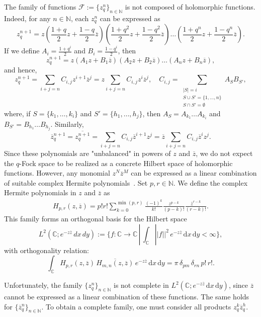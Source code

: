 \documentclass[10pt]{amsart}
\theoremstyle{plain}
\theoremstyle{definition}
\newtheorem{definition}[theorem]{Definition}
\renewcommand{\bar}[1]{\overline{#1}}
\begin{document}
The family of functions $\mathcal{F} := \{z_q^n\}_{n \in \mathbb{N}}$ is not composed of holomorphic functions. Indeed, for any $ n \in \mathbb{N} $, each $ z_q^n $ can be expressed as~\cite{Pashaev2014,Am}
\[
z_q^{n+1} = z\left(\frac{1+q}{2}z + \frac{1-q}{2}\bar{z}\right)
\left(\frac{1+q^2}{2}z + \frac{1-q^2}{2}\bar{z}\right)
\dots \left(\frac{1+q^n}{2}z + \frac{1-q^n}{2}\bar{z}\right).
\]
If we define $ A_i = \frac{1 + q^{i}}{2} $ and $ B_i = \frac{1 - q^{i}}{2} $, then
\[
z_q^{n+1}  = z(A_1 z + B_1 \bar{z}) (A_2 z + B_2 \bar{z}) \dots (A_n z + B_n \bar{z}),
\]
and hence,
$$
z_q^{n+1} = \sum_{i + j = n} C_{i,j} z^{i+1} \bar{z}^j  = z\sum_{i + j = n} C_{i,j} z^{i} \bar{z}^j , \quad 
C_{i,j} = \sum_{\substack{|S| = i \\ S \cup S' = \{1, \dots, n\} \\  S \cap S' = \emptyset}} A_S B_{S'},
$$
where, if $ S = \{k_1, \dots, k_i\} $ and $ S' = \{h_1, \dots, h_j\} $, then $ A_S = A_{k_1} \dots A_{k_i} $ and $ B_{S'} = B_{h_1} \dots B_{h_j} $.
{ Similarly, }
$${ \bar{z}_q^{n+1} = \bar{z_q^{n+1}} = \sum_{i + j = n} C_{i,j} \bar z^{i+1} {z}^j  = \bar{z} \sum_{i + j = n} C_{i,j} \bar{z}^{i} z^j  . }
$$
Since these polynomials are "unbalanced" in powers of $ z $ and $ \bar{z} $, we do not expect the $q$-Fock space to be realized as a concrete Hilbert space of holomorphic functions. However, any monomial $ z^N \bar{z}^M $ can be expressed as a linear combination of suitable complex Hermite polynomials~\cite{Ghanmi}.
Set $p,r\in\mathbb{N}$. We define the complex Hermite polynomials in $z$ and $\bar z$ as
\begin{eqnarray}\label{hermite}
H_{p,r}(z, \bar{z}) = p! r! \sum_{k=0}^{\min(p,r)} \frac{(-1)^k}{k!} \frac{z^{p-k}}{(p-k)!} \frac{\bar{z}^{r-k}}{(r-k)!}.
\end{eqnarray}
This family forms an orthogonal basis for the Hilbert space~\cite{Ghanmi}
\[
L^2(\mathbb{C}; e^{-z\bar z} \, dx\,dy):=\{f:\mathbb{C}\to\mathbb{C}\,|\,\int_{\mathbb{C}} ||f||^{2}\, e^{-z\bar z} \, \mathrm{d}x \, \mathrm{d}y<\infty\},
\]
with orthogonality relation:
\[
\int_{\mathbb{C}} H_{p,r}(z, \bar{z}) \, \overline{H_{m,n}(z, \bar{z})} \, e^{-z\bar z} \, \mathrm{d}x \, \mathrm{d}y = \pi \, \delta_{pm} \, \delta_{rn} \, p! \, r!.
\]

Unfortunately, the family $ \{z_q^n\}_{n \in \mathbb{N}} $ is not complete in $ L^2(\mathbb{C}; e^{-z\bar z} \, \mathrm{d}x\,\mathrm{d}y) $, since $ \bar{z} $ cannot be expressed as a linear combination of these functions. The same holds for $ \{\bar{z}_q^n\}_{n \in \mathbb{N}} $. To obtain a complete family, one must consider all products $ z_q^k \bar{z}_q^h $.
\end{document}
